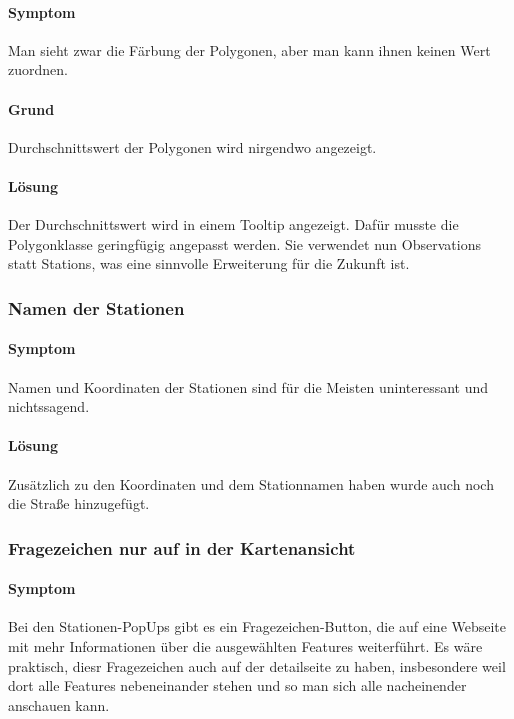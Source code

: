 \paragraph{Symptom}

Man sieht zwar die Färbung der Polygonen, aber man kann ihnen keinen Wert zuordnen.


\paragraph{Grund}
Durchschnittswert der Polygonen wird nirgendwo angezeigt.

\paragraph{Lösung}
Der Durchschnittswert wird in einem Tooltip angezeigt. Dafür musste die Polygonklasse geringfügig
angepasst werden. Sie verwendet nun Observations statt Stations, was eine sinnvolle Erweiterung für die Zukunft ist.


\subsubsection{Namen der Stationen}
\paragraph{Symptom}

Namen und Koordinaten der Stationen sind für die Meisten uninteressant und nichtssagend.
 

\paragraph{Lösung}
Zusätzlich zu den Koordinaten und dem Stationnamen haben wurde auch noch die Straße hinzugefügt.

\subsubsection{Fragezeichen nur auf in der Kartenansicht}
\paragraph{Symptom}
Bei den Stationen-PopUps gibt es ein Fragezeichen-Button, die auf eine Webseite mit mehr Informationen über die ausgewählten Features weiterführt. Es wäre praktisch, diesr Fragezeichen auch auf der detailseite zu haben, insbesondere weil dort alle Features nebeneinander stehen und so man sich alle nacheinender anschauen kann.


